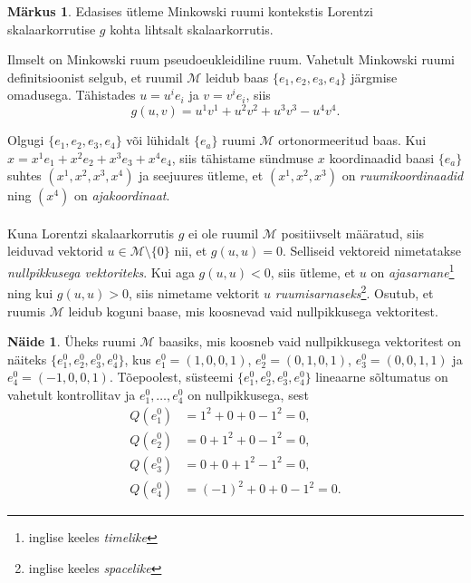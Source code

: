 \documentclass[a4paper,12pt]{article}
\theoremstyle{plain}
\theoremstyle{definition}
\newtheorem{naide}{Näide}[section]
\newtheorem{markus}{Märkus}[section]
\numberwithin{equation}{section}
\def\M{{\mathcal M}}
\begin{document}
\begin{markus}
Edasises ütleme Minkowski ruumi kontekstis Lorentzi skalaarkorrutise $g$ kohta lihtsalt skalaarkorrutis.
\end{markus}

Ilmselt on Minkowski ruum pseudoeukleidiline ruum. Vahetult Minkowski ruumi definitsioonist selgub, et ruumil $\M$ leidub baas $\{e_1, e_2, e_3, e_4\}$ järgmise omadusega. Tähistades $u = u^i e_i$ ja $v = v^i e_i$, siis
\[g\left(u, v\right) = u^1 v^1 + u^2 v^2 + u^3 v^3 - u^4 v^4.\]

Olgugi $\{e_1, e_2, e_3, e_4\}$ või lühidalt $\{e_a\}$ ruumi $\M$ ortonormeeritud baas. 
Kui $x = x^1 e_1 + x^2 e_2 + x^3 e_3 + x^4 e_4$, siis tähistame sündmuse $x$ koordinaadid baasi $\{e_a\}$ suhtes $\left( x^1, x^2, x^3, x^4 \right)$ ja seejuures ütleme, et $\left( x^1, x^2, x^3 \right)$ on \emph{ruumikoordinaadid} ning $\left(x^4\right)$ on \emph{ajakoordinaat}.
\paragraph{}
Kuna Lorentzi skalaarkorrutis $g$ ei ole ruumil $\M$ positiivselt määratud, siis leiduvad vektorid $u \in \M \setminus \{0\}$ nii, et $g \left(u, u\right) = 0$. Selliseid vektoreid nimetatakse \emph{nullpikkusega vektoriteks}. Kui aga $g \left(u, u\right) < 0$, siis ütleme, et $u$ on \emph{ajasarnane}\footnote{inglise keeles \textit{timelike}} ning kui $g \left(u, u\right) > 0$, siis nimetame vektorit $u$ \emph{ruumisarnaseks}\footnote{inglise keeles \textit{spacelike}}. Osutub, et ruumis $\M$ leidub koguni baase, mis koosnevad vaid nullpikkusega vektoritest.

\begin{naide}
Üheks ruumi $\M$ baasiks, mis koosneb vaid nullpikkusega vektoritest on näiteks $\{e_1^0, e_2^0, e_3^0, e_4^0\}$, kus $e_1^0 = \left(1, 0, 0, 1\right)$, $e_2^0 = \left(0, 1, 0, 1\right)$, $e_3^0 = \left(0, 0, 1, 1\right)$ ja $e_4^0 = \left(-1, 0, 0, 1\right).$
Tõepoolest, süsteemi $\{e_1^0, e_2^0, e_3^0, e_4^0\}$ lineaarne sõltumatus on vahetult kontrollitav ja $e_1^0, \dots, e_4^0$ on nullpikkusega, sest
\begin{align*}
Q\left(e_1^0\right) &= 1^2 + 0 + 0 - 1^2 = 0, \\
Q\left(e_2^0\right) &= 0 + 1^2 + 0 - 1^2 = 0, \\
Q\left(e_3^0\right) &= 0 + 0 + 1^2 - 1^2 = 0, \\
Q\left(e_4^0\right) &= (-1)^2 + 0 + 0 - 1^2 = 0.
\end{align*}
\end{naide}
\end{document}
